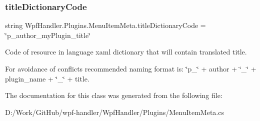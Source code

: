 \subsubsection{\texorpdfstring{title\+Dictionary\+Code}{titleDictionaryCode}}
{\footnotesize\ttfamily string Wpf\+Handler.\+Plugins.\+Menu\+Item\+Meta.\+title\+Dictionary\+Code = \char`\"{}p\+\_\+author\+\_\+my\+Plugin\+\_\+title\char`\"{}}



Code of resource in language xaml dictionary that will contain translated title. 

For avoidance of conflicts recommended naming format is\+: \char`\"{}p\+\_\+\char`\"{} + author + \char`\"{}\+\_\+\char`\"{} + plugin\+\_\+name + \char`\"{}\+\_\+\char`\"{} + title. 

The documentation for this class was generated from the following file\+:\begin{DoxyCompactItemize}
\item 
D\+:/\+Work/\+Git\+Hub/wpf-\/handler/\+Wpf\+Handler/\+Plugins/Menu\+Item\+Meta.\+cs\end{DoxyCompactItemize}
